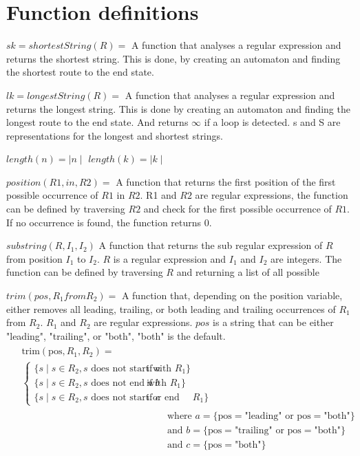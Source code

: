 \section{Function definitions} \label{subsec:function-definitions}
$sk = shortestString(R) =$ A function that analyses a regular expression and returns the shortest string. This is done, by creating an automaton and finding the shortest route to the end state.

$lk = longestString(R) =$ A function that analyses a regular expression and returns the longest string. This is done by creating an automaton and finding the longest route to the end state. And returns $\infty$ if a loop is detected.
s and S are representations for the longest and shortest strings.

$length(n) = \mid n \mid$
$length(k) = \mid k \mid$


$position(R1, in, R2) =$ A function that returns the first position of the first possible occurrence of $R1$ in $R2$.
R1 and $R2$ are regular expressions, the function can be defined by traversing $R2$ and check for the first possible occurrence of $R1$. If no occurrence is found, the function returns $0$.

$substring(R, I_1, I_2)$ A function that returns the sub regular expression of $R$ from position $I_1$ to $I_2$.
$R$ is a regular expression and $I_1$ and $I_2$ are integers. The function can be defined by traversing $R$ and returning a list of all possible


$trim(pos, R_1 from R_2) =$ A function that, depending on the position variable, either removes all leading, trailing, or both leading and trailing occurrences of $R_1$ from $R_2$.
$R_1$ and $R_2$ are regular expressions. $pos$ is a string that can be either "leading", "trailing", or "both", "both" is the default.
\begin{align}
    \begin{split}
        &\text{trim}(\text{pos}, R_1, R_2) = \\
        &\begin{cases}
             \{ s \mid s \in R_2, s \text{ does not start with } R_1 \}        & \text{if } a\\
             \{ s \mid s \in R_2, s \text{ does not end with } R_1 \}          & \text{if } b \\
             \{ s \mid s \in R_2, s \text{ does not start or end with } R_1 \} & \text{if } c
        \end{cases}
    \end{split} \\
    &\text{where } a=\{\text{pos} = \text{"leading"} \text{ or } \text{pos} = \text{"both"}\} \\
    &\text{and } b=\{\text{pos} = \text{"trailing"} \text{ or } \text{pos} = \text{"both"}\} \\
    &\text{and } c=\{\text{pos} = \text{"both"}\}
\end{align}